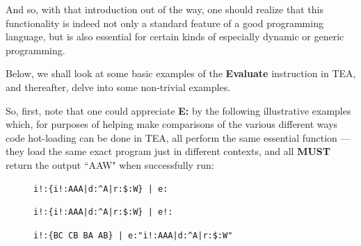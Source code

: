 \documentclass[a4paper, 18pt]{book} %
\begin{document}
And so, with that introduction out of the way, one should realize that this functionality is indeed not only a standard feature of a good programming language, but is also essential for certain kinds of especially dynamic or generic programming. 

\vspace{1em}

Below, we shall look at some basic examples of the \textbf{Evaluate} instruction in TEA, and thereafter, delve into some non-trivial examples.

\vspace{1em}

So, first, note that one could appreciate \textbf{E:} by the following illustrative examples which, for purposes of helping make comparisons of the various different ways code hot-loading can be done in TEA, all perform the same essential function --- they load the same exact program just in different contexts, and all \textbf{MUST} return the output ``AAW" when successfully run:


 \begin{figure}[H]
 \Large
  \centering
  \begin{tcolorbox}[teaterminalstyle, title=Implicit Context Unaware Evaluation]
  \begin{lstlisting}[language=TEA]
i!:{i!:AAA|d:^A|r:$:W} | e:
   \end{lstlisting}
  \end{tcolorbox}
\end{figure}

 \begin{figure}[H]
 \Large
  \centering
  \begin{tcolorbox}[teaterminalstyle, title=Implicit Extended Context Aware Evaluation]
  \begin{lstlisting}[language=TEA]
i!:{i!:AAA|d:^A|r:$:W} | e!:
   \end{lstlisting}
  \end{tcolorbox}
\end{figure}


\begin{figure}[H]
 \Large
  \centering
  \begin{tcolorbox}[teaterminalstyle, title=Explicit Context Unaware Evaluation]
  \begin{lstlisting}[language=TEA]
i!:{BC CB BA AB} | e:"i!:AAA|d:^A|r:$:W" 
   \end{lstlisting}
  \end{tcolorbox}
\end{figure}
\end{document}

